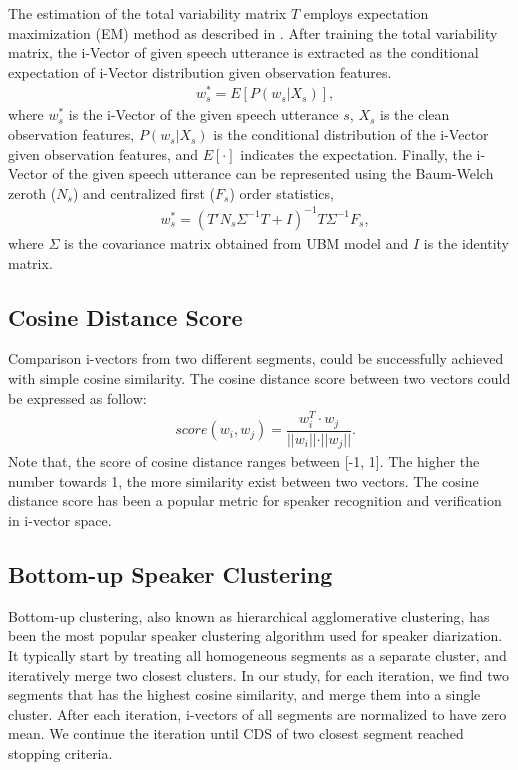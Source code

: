 \documentclass[journal]{IEEEtran}
\begin{document}
The estimation of the total variability matrix $T$ employs expectation maximization (EM) method as described in \cite{kenny2005eigenvoice}. 
After training the total variability matrix, 
the i-Vector of given speech utterance is extracted as the conditional expectation of i-Vector distribution given observation features.
\begin{equation}
\begin{aligned}
&w_{s}^{\ast}=E[P(w_{s}|X_{s})],
\label{eq:ws}
\end{aligned}
\end{equation}
where $w_{s}^{\ast}$ is the i-Vector of the given speech utterance $s$, 
$X_{s}$ is the clean observation features, 
$P(w_{s}|X_{s})$ is the conditional distribution of the i-Vector given observation features, 
and $E[\cdot]$ indicates the expectation. 
Finally, the i-Vector of the given speech utterance can be represented using the Baum-Welch zeroth ($N_s$) and centralized first ($F_s$) order statistics,
\begin{equation}
\begin{aligned}
&w_{s}^{\ast}=(T'N_{s}\Sigma^{-1}T+I)^{-1}T\Sigma^{-1}F_{s},
\label{ws2}
\end{aligned}
\end{equation}
where $\Sigma$ is the covariance matrix obtained from UBM model and $I$ is the identity matrix.

\subsection{Cosine Distance Score}
Comparison  i-vectors from two different segments, could be successfully achieved with simple cosine similarity. The cosine distance score between two vectors could be expressed as follow:
\begin{equation}
\begin{aligned}
& score (w_i, w_j) = \dfrac{w^T_i \cdot w_j}{\rvert\rvert{w_i}\rvert\rvert \cdot \rvert\rvert{w_j}\rvert\rvert}.
\label{ws2}
\end{aligned}
\end{equation}
Note that, the score of cosine distance ranges between [-1, 1]. The higher the number towards 1, the more similarity exist between two vectors. The cosine distance score has been a popular metric for speaker recognition and verification in i-vector space.
 
\subsection{Bottom-up Speaker Clustering}
Bottom-up clustering, also known as hierarchical agglomerative clustering, has been the most popular speaker clustering algorithm used for speaker diarization. It typically start by treating all homogeneous segments as a separate cluster, and iteratively merge two closest clusters. In our study, for each iteration, we find two segments that has the highest cosine similarity, and merge them into a single cluster. After each iteration, i-vectors of all segments are normalized to have zero mean. We continue the iteration until CDS of two closest segment reached stopping criteria. 
\end{document}
